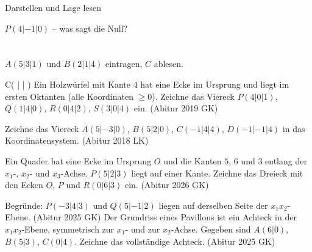 \setcounter{aufgabe}{10}

\begin{aufgabe}{Darstellen und Lage lesen}
\begin{teile}
\teil $P(4 | -1 | 0)$ – was sagt die Null? \\  \\  \\ 
\teil $A(5 | 3 | 1)$ und $B(2 | 1 | 4)$ eintragen, $C$ ablesen.

\begin{ksys3}  \end{ksys3}
C( \leerfeld | \leerfeld | \leerfeld )
\teil Ein Holzwürfel mit Kante $4$ hat eine Ecke im Ursprung und liegt im ersten Oktanten (alle Koordinaten $\ge 0$). Zeichne das Viereck $P(4 | 0 | 1)$, $Q(1 | 4 | 0)$, $R(0 | 4 | 2)$, $S(3 | 0 | 4)$ ein. \hfill (Abitur 2019 GK)

\begin{ksys3}  \end{ksys3}
\teil Zeichne das Viereck $A(5 | -3 | 0)$, $B(5 | 2 | 0)$, $C(-1 | 4 | 4)$, $D(-1 | -1 | 4)$ in das Koordinatensystem. \hfill (Abitur 2018 LK)

\begin{ksys3} \end{ksys3}
\teil Ein Quader hat eine Ecke im Ursprung $O$ und die Kanten $5$, $6$ und $3$ entlang der $x_1$-, $x_2$- und $x_3$-Achse. $P(5 | 2 | 3)$ liegt auf einer Kante. Zeichne das Dreieck mit den Ecken $O$, $P$ und $R(0 | 6 | 3)$ ein. \hfill (Abitur 2026 GK)

\begin{ksys3}  \end{ksys3}
\teil Begründe: $P(-3 | 4 | 3)$ und $Q(5 | -1 | 2)$ liegen auf derselben Seite der $x_1x_2$-Ebene. \hfill (Abitur 2025 GK)
\teil Der Grundriss eines Pavillons ist ein Achteck in der $x_1x_2$-Ebene, symmetrisch zur $x_1$- und zur $x_2$-Achse. Gegeben sind $A(6 | 0)$, $B(5 | 3)$, $C(0 | 4)$. Zeichne das vollständige Achteck. \hfill (Abitur 2025 GK)


\end{teile}
\end{aufgabe}
